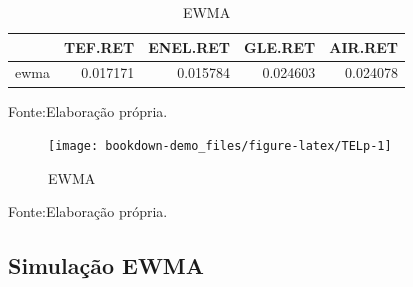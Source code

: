 \documentclass[
  12pt,
  a4paper,
  openany]{book}
\newenvironment{Shaded}{\begin{snugshade}}{\end{snugshade}}
\newcommand{\ControlFlowTok}[1]{\textcolor[rgb]{0.13,0.29,0.53}{\textbf{#1}}}
\newcommand{\DataTypeTok}[1]{\textcolor[rgb]{0.13,0.29,0.53}{#1}}
\newcommand{\DecValTok}[1]{\textcolor[rgb]{0.00,0.00,0.81}{#1}}
\newcommand{\FloatTok}[1]{\textcolor[rgb]{0.00,0.00,0.81}{#1}}
\newcommand{\KeywordTok}[1]{\textcolor[rgb]{0.13,0.29,0.53}{\textbf{#1}}}
\newcommand{\NormalTok}[1]{#1}
\newcommand{\OperatorTok}[1]{\textcolor[rgb]{0.81,0.36,0.00}{\textbf{#1}}}
\newcommand{\StringTok}[1]{\textcolor[rgb]{0.31,0.60,0.02}{#1}}
\begin{document}
\scriptsize

\begin{Shaded}
\end{Shaded}

\normalsize

\begin{table}[!h]

\caption{\label{tab:unnamed-chunk-9}EWMA}
\centering
\begin{tabular}[t]{lrrrr}
\toprule
  & TEF.RET & ENEL.RET & GLE.RET & AIR.RET\\
\midrule
ewma & 0.017171 & 0.015784 & 0.024603 & 0.024078\\
\bottomrule
\end{tabular}
\end{table}
\FloatBarrier
\centering

Fonte:Elaboração própria.

\justifying
\bigskip

\begin{figure}

{\centering \texttt{[image: bookdown-demo\_files/figure-latex/TELp-1]} 

}

\caption{EWMA}\label{fig:TELp}
\end{figure}
\FloatBarrier
\centering

Fonte:Elaboração própria.

\justifying
\bigskip

\hypertarget{simulauxe7uxe3o-ewma}{%
\subsection{Simulação EWMA}\label{simulauxe7uxe3o-ewma}}
\end{document}
